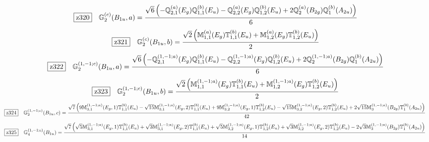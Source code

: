\documentclass[fleqn,10pt,landscape]{jsarticle}
\begin{document}
\begin{dmath*}
\hspace*{3mm}\fbox{z320}\quad \mathbb{G}_{2}^{(c)}(B_{1u},a)=\frac{\sqrt{6} \left(- \mathbb{Q}_{2,1}^{(a)}(E_{g}) \mathbb{Q}_{1,1}^{(b)}(E_{u}) - \mathbb{Q}_{2,2}^{(a)}(E_{g}) \mathbb{Q}_{1,2}^{(b)}(E_{u}) + 2 \mathbb{Q}_{2}^{(a)}(B_{2g}) \mathbb{Q}_{1}^{(b)}(A_{2u})\right)}{6}
\end{dmath*}
\begin{dmath*}
\hspace*{3mm}\fbox{z321}\quad \mathbb{G}_{2}^{(c)}(B_{1u},b)=\frac{\sqrt{2} \left(\mathbb{M}_{1,1}^{(a)}(E_{g}) \mathbb{T}_{1,1}^{(b)}(E_{u}) + \mathbb{M}_{1,2}^{(a)}(E_{g}) \mathbb{T}_{1,2}^{(b)}(E_{u})\right)}{2}
\end{dmath*}
\begin{dmath*}
\hspace*{3mm}\fbox{z322}\quad \mathbb{G}_{2}^{(1,-1;c)}(B_{1u},a)=\frac{\sqrt{6} \left(- \mathbb{Q}_{2,1}^{(1,-1;a)}(E_{g}) \mathbb{Q}_{1,1}^{(b)}(E_{u}) - \mathbb{Q}_{2,2}^{(1,-1;a)}(E_{g}) \mathbb{Q}_{1,2}^{(b)}(E_{u}) + 2 \mathbb{Q}_{2}^{(1,-1;a)}(B_{2g}) \mathbb{Q}_{1}^{(b)}(A_{2u})\right)}{6}
\end{dmath*}
\begin{dmath*}
\hspace*{3mm}\fbox{z323}\quad \mathbb{G}_{2}^{(1,-1;c)}(B_{1u},b)=\frac{\sqrt{2} \left(\mathbb{M}_{1,1}^{(1,-1;a)}(E_{g}) \mathbb{T}_{1,1}^{(b)}(E_{u}) + \mathbb{M}_{1,2}^{(1,-1;a)}(E_{g}) \mathbb{T}_{1,2}^{(b)}(E_{u})\right)}{2}
\end{dmath*}
\begin{dmath*}
\hspace*{3mm}\fbox{z324}\quad \mathbb{G}_{2}^{(1,-1;c)}(B_{1u},c)=\frac{\sqrt{7} \left(9 \mathbb{M}_{3,1}^{(1,-1;a)}(E_{g},1) \mathbb{T}_{1,1}^{(b)}(E_{u}) - \sqrt{15} \mathbb{M}_{3,1}^{(1,-1;a)}(E_{g},2) \mathbb{T}_{1,1}^{(b)}(E_{u}) + 9 \mathbb{M}_{3,2}^{(1,-1;a)}(E_{g},1) \mathbb{T}_{1,2}^{(b)}(E_{u}) - \sqrt{15} \mathbb{M}_{3,2}^{(1,-1;a)}(E_{g},2) \mathbb{T}_{1,2}^{(b)}(E_{u}) + 2 \sqrt{15} \mathbb{M}_{3}^{(1,-1;a)}(B_{2g}) \mathbb{T}_{1}^{(b)}(A_{2u})\right)}{42}
\end{dmath*}
\begin{dmath*}
\hspace*{3mm}\fbox{z325}\quad \mathbb{G}_{4}^{(1,-1;c)}(B_{1u})=\frac{\sqrt{7} \left(\sqrt{5} \mathbb{M}_{3,1}^{(1,-1;a)}(E_{g},1) \mathbb{T}_{1,1}^{(b)}(E_{u}) + \sqrt{3} \mathbb{M}_{3,1}^{(1,-1;a)}(E_{g},2) \mathbb{T}_{1,1}^{(b)}(E_{u}) + \sqrt{5} \mathbb{M}_{3,2}^{(1,-1;a)}(E_{g},1) \mathbb{T}_{1,2}^{(b)}(E_{u}) + \sqrt{3} \mathbb{M}_{3,2}^{(1,-1;a)}(E_{g},2) \mathbb{T}_{1,2}^{(b)}(E_{u}) - 2 \sqrt{3} \mathbb{M}_{3}^{(1,-1;a)}(B_{2g}) \mathbb{T}_{1}^{(b)}(A_{2u})\right)}{14}
\end{dmath*}
\end{document}
